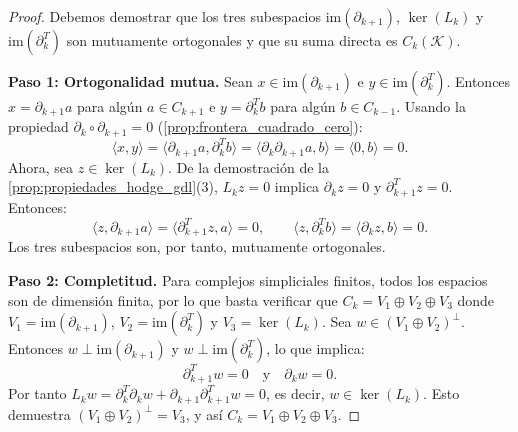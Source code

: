 \begin{proof}
	Debemos demostrar que los tres subespacios $\mathrm{im}(\partial_{k+1})$, $\ker(L_k)$ y $\mathrm{im}(\partial_k^T)$ son mutuamente ortogonales y que su suma directa es $C_k(\mathcal{K})$.

	\textbf{Paso 1: Ortogonalidad mutua.} Sean $x \in \mathrm{im}(\partial_{k+1})$ e $y \in \mathrm{im}(\partial_k^T)$. Entonces $x = \partial_{k+1} a$ para algún $a \in C_{k+1}$ e $y = \partial_k^T b$ para algún $b \in C_{k-1}$. Usando la propiedad $\partial_k \circ \partial_{k+1} = 0$ (\autoref{prop:frontera_cuadrado_cero}):
	\[
		\langle x, y \rangle = \langle \partial_{k+1} a, \partial_k^T b \rangle = \langle \partial_k \partial_{k+1} a, b \rangle = \langle 0, b \rangle = 0.
	\]
	Ahora, sea $z \in \ker(L_k)$. De la demostración de la \autoref{prop:propiedades_hodge_gdl}(3), $L_k z = 0$ implica $\partial_k z = 0$ y $\partial_{k+1}^T z = 0$. Entonces:
	\[
		\langle z, \partial_{k+1} a \rangle = \langle \partial_{k+1}^T z, a \rangle = 0, \qquad
		\langle z, \partial_k^T b \rangle = \langle \partial_k z, b \rangle = 0.
	\]
	Los tres subespacios son, por tanto, mutuamente ortogonales.

	\textbf{Paso 2: Completitud.} Para complejos simpliciales finitos, todos los espacios son de dimensión finita, por lo que basta verificar que $C_k = V_1 \oplus V_2 \oplus V_3$ donde $V_1 = \mathrm{im}(\partial_{k+1})$, $V_2 = \mathrm{im}(\partial_k^T)$ y $V_3 = \ker(L_k)$. Sea $w \in (V_1 \oplus V_2)^\perp$. Entonces $w \perp \mathrm{im}(\partial_{k+1})$ y $w \perp \mathrm{im}(\partial_k^T)$, lo que implica:
	\[
		\partial_{k+1}^T w = 0 \quad \text{y} \quad \partial_k w = 0.
	\]
	Por tanto $L_k w = \partial_k^T \partial_k w + \partial_{k+1} \partial_{k+1}^T w = 0$, es decir, $w \in \ker(L_k)$. Esto demuestra $(V_1 \oplus V_2)^\perp = V_3$, y así $C_k = V_1 \oplus V_2 \oplus V_3$.
\end{proof}

